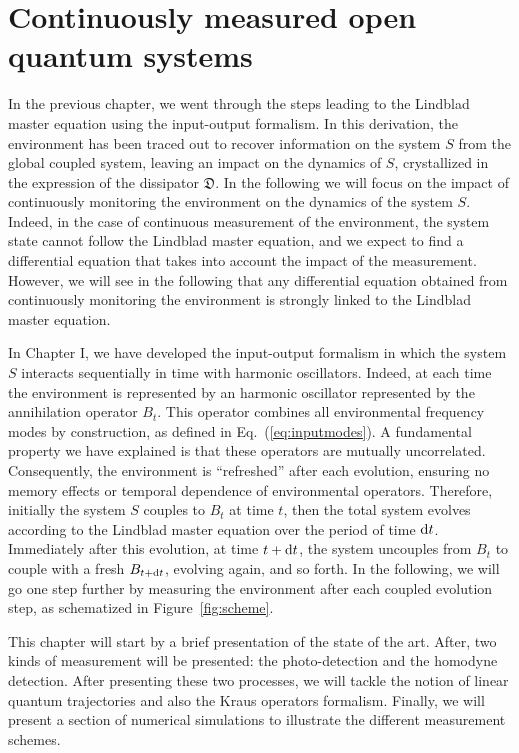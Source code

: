 \chapter{Continuously measured open quantum systems}
\setcounter{footnote}{6}
In the previous chapter, we went through the steps leading to the Lindblad master equation using the input-output formalism. In this derivation, the environment has been traced out to recover information on the system $S$ from the global coupled system, leaving an impact on the dynamics of $S$, crystallized in the expression of the dissipator $\mathfrak{D}$. In the following we will focus on the impact of continuously monitoring the environment on the dynamics of the system $S$. Indeed, in the case of continuous measurement of the environment, the system state cannot follow the Lindblad master equation, and we expect to find a differential equation that takes into account the impact of the measurement. However, we will see in the following that any differential equation obtained from continuously monitoring the environment is strongly linked to the Lindblad master equation.

In Chapter I, we have developed the input-output formalism in which the system $S$ interacts sequentially in time with harmonic oscillators. Indeed, at each time the environment is represented by an harmonic oscillator represented by the annihilation operator $B_t$. This operator combines all environmental frequency modes by construction, as defined in Eq.~(\ref{eq:inputmodes}). A fundamental property we have explained is that these operators are mutually uncorrelated. Consequently, the environment is ``refreshed'' after each evolution, ensuring no memory effects or temporal dependence of environmental operators. Therefore, initially the system $S$ couples to $B_t$ at time $t$, then the total system evolves according to the Lindblad master equation over the period of time $\mathrm{d}t$. Immediately after this evolution, at time $t+\mathrm{d}t$, the system uncouples from $B_t$ to couple with a fresh $B_{t+\mathrm{d}t}$, evolving again, and so forth. In the following, we will go one step further by measuring the environment after each coupled evolution step, as schematized in Figure~\ref{fig:scheme}. 

This chapter will start by a brief presentation of the state of the art. After, two kinds of measurement will be presented: the photo-detection and the homodyne detection. After presenting these two processes, we will tackle the notion of linear quantum trajectories and also the Kraus operators formalism. Finally, we will present a section of numerical simulations to illustrate the different measurement schemes.

